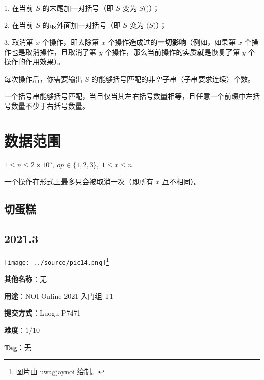 \documentclass[a4paper,10pt]{article}
\begin{document}
1. 在当前 $S$ 的末尾加一对括号（即 $S$ 变为 $S\texttt{()}$）；

2. 在当前 $S$ 的最外面加一对括号（即 $S$ 变为 $\texttt{(}S\texttt{)}$）；

3. 取消第 $x$ 个操作，即去除第 $x$ 个操作造成过的\textbf{一切影响}（例如，如果第 $x$ 个操作也是取消操作，且取消了第 $y$ 个操作，那么当前操作的实质就是恢复了第 $y$ 个操作的作用效果）。

每次操作后，你需要输出 $S$ 的能够括号匹配的非空子串（子串要求连续）个数。

一个括号串能够括号匹配，当且仅当其左右括号数量相等，且任意一个前缀中左括号数量不少于右括号数量。

\section*{数据范围}

$1\leq n\leq 2\times 10^5,\ op\in \{1,2,3\},\ 1\leq x\leq n$

一个操作在形式上最多只会被取消一次（即所有 $x$ 互不相同）。

\newpage

\vspace*{\fill}
\begin{center}

\section{切蛋糕}

\subsection*{2021.3}

\vspace{10pt}

\texttt{[image: ../source/pic14.png]}\footnote{图片由 uwagjaynoi 绘制。}

\vspace{10pt}

\textbf{其他名称}：无

\vspace{10pt}

\textbf{用途}：NOI Online 2021 入门组 T1

\vspace{10pt}

\textbf{提交方式}：Luogu P7471

\vspace{10pt}

\textbf{难度}：$1/10$

\vspace{10pt}

\textbf{Tag}：无

\end{center}
\vspace*{\fill}
\end{document}
